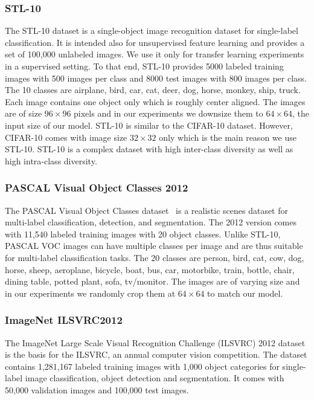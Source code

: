 \documentclass[12pt,a4paper]{article}
\begin{document}
\subsubsection{STL-10}
The STL-10 \cite{singleLayerNetworks} dataset is a single-object image recognition dataset for single-label classification. It is intended also for unsupervised feature learning and provides a set of 100,000 unlabeled images. We use it only for transfer learning experiments in a supervised setting. To that end, STL-10 provides 5000 labeled training images with 500 images per class and 8000 test images with 800 images per class. The 10 classes are airplane, bird, car, cat, deer, dog, horse, monkey, ship, truck. Each image contains one object only which is roughly center aligned. The images are of size $96 \times 96$ pixels and in our experiments we downsize them to $64 \times 64$, the input size of our model. STL-10 is similar to the CIFAR-10 dataset. However, CIFAR-10 comes with image size $32 \times 32$ only which is the main reason we use STL-10. STL-10 is a complex dataset with high inter-class diversity as well as high intra-class diversity.


\subsubsection{PASCAL Visual Object Classes 2012}
The PASCAL Visual Object Classes dataset~\cite{PascalVocDataset} is a realistic scenes dataset for multi-label classification, detection, and segmentation. The 2012 version comes with 11,540 labeled training images with 20 object classes. Unlike STL-10, PASCAL VOC images can have multiple classes per image and are thus suitable for multi-label classification tasks. The 20 classes are person, bird, cat, cow, dog, horse, sheep, aeroplane, bicycle, boat, bus, car, motorbike, train, bottle, chair, dining table, potted plant, sofa, tv/monitor. The images are of varying size and in our experiments we randomly crop them at $64 \times 64$ to match our model.


\subsubsection{ImageNet ILSVRC2012}
The ImageNet Large Scale Visual Recognition Challenge (ILSVRC) 2012 dataset \cite{ILSVRC2012} is the basis for the ILSVRC, an annual computer vision competition. The dataset contains 1,281,167 labeled training images with 1,000 object categories for single-label image classification, object detection and segmentation. It comes with 50,000 validation images and 100,000 test images. 
\end{document}
